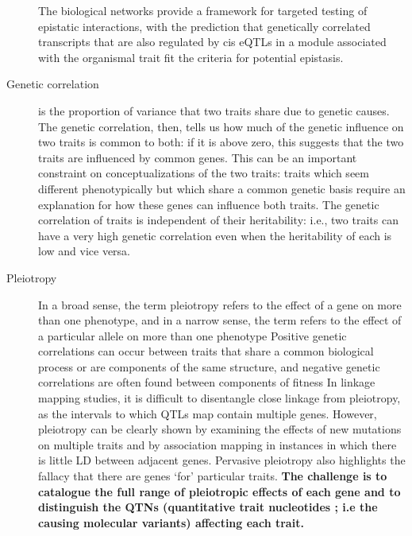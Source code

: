 \documentclass[a4paper,10pt]{article}
\begin{document}
\begin{description}
The biological networks provide a framework for targeted testing of epistatic interactions, with the prediction that genetically correlated transcripts that are also regulated by cis eQTLs in a module associated with the organismal trait fit the criteria for potential epistasis.


\item[Genetic correlation] is the proportion of variance that two traits share due to genetic causes.
The genetic correlation, then, tells us how much of the genetic influence on two traits is common to both: if it is above zero, this suggests that the two traits are influenced by common genes. 
This can be an important constraint on conceptualizations of the two traits: traits which seem different phenotypically but which share a common genetic basis require an explanation for how these genes can influence both traits.
The genetic correlation of traits is independent of their heritability: i.e., two traits can have a very high genetic correlation even when the heritability of each is low and vice versa.



\item [Pleiotropy] In a broad sense, the term pleiotropy refers to the effect of a gene on more than one phenotype, and in a narrow sense, the term refers to the effect of a particular allele on more than one phenotype
Positive genetic correlations can occur between traits that share a common biological process or are components of the same structure, and negative genetic correlations are often found between components of fitness
In linkage mapping studies, it is difficult to disentangle close linkage from pleiotropy, as the intervals to which QTLs map contain multiple genes.
However, pleiotropy can be clearly shown by examining the effects of new mutations on multiple traits and by association mapping in instances in which there is little LD between adjacent genes.
Pervasive pleiotropy also highlights the fallacy that there are genes ‘for’ particular traits.
\textbf{The challenge is to catalogue the full range of pleiotropic effects of each gene and to distinguish the QTNs (quantitative trait nucleotides ; i.e the causing molecular variants) affecting each trait.}



\end{description}
\end{document}
